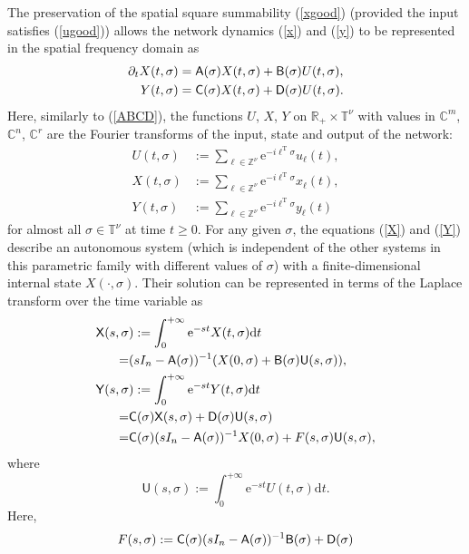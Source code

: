 \documentclass[letterpaper, 10pt, conference]{ieeeconf}  %
\def\>{\geqslant}           %
\def\d{\partial}
\def\mZ{\mathbb{Z}}    %
\def\mR{\mathbb{R}}    %
\def\mC{\mathbb{C}}    %
\def\rT{\mathrm{T}}        %
\def\re{\mathrm{e}}        %
\def\rd{\mathrm{d}}        %
\def\x{\times}
\def\sA{\mathsf{A}}
\def\sB{\mathsf{B}}
\def\sC{\mathsf{C}}
\def\sD{\mathsf{D}}
\def\sX{\mathsf{X}}
\def\sY{\mathsf{Y}}
\def\sU{\mathsf{U}}
\def\sB{{\sf B}}
\def\sC{{\sf C}}
\def\mT{\mathbb{T}}
\def\mZ{\mathbb{Z}}
\begin{document}
The preservation of the spatial square summability (\ref{xgood}) (provided the input satisfies (\ref{ugood})) allows the network dynamics (\ref{x}) and (\ref{y}) to be represented in the spatial frequency domain as
\begin{align}
\label{X}
  \d_t X(t,\sigma)
  & =
  \sA(\sigma) X(t,\sigma) + \sB(\sigma) U(t,\sigma),\\
\label{Y}
  Y(t,\sigma)
  & =
  \sC(\sigma) X(t,\sigma)+\sD(\sigma) U(t,\sigma).
\end{align}
Here, similarly to (\ref{ABCD}), the functions $U$, $X$, $Y$ on $\mR_+\x \mT^\nu$ with values in $\mC^m$, $\mC^n$, $\mC^r$ are the Fourier transforms of the input, state and output of the network:
\begin{align}
\label{uDFT}
    U(t,\sigma)
    & :=
    \sum_{\ell\in \mZ^\nu}
    \re^{-i\ell^{\rT}\sigma}
    u_\ell(t),\\
\label{xDFT}
    X(t,\sigma)
    & :=
    \sum_{\ell\in \mZ^\nu}
    \re^{-i\ell^{\rT}\sigma}
    x_\ell(t),\\
\label{yDFT}
    Y(t,\sigma)
    & :=
    \sum_{\ell\in \mZ^\nu}
    \re^{-i\ell^{\rT}\sigma}
    y_\ell(t)
\end{align}
for almost all $\sigma \in \mT^\nu$ at time $t\> 0$. For any given $\sigma$, the equations (\ref{X}) and (\ref{Y}) describe an autonomous system (which is independent of the other systems in this parametric family with different values of $\sigma$) with a finite-dimensional internal state $X(\cdot, \sigma)$.  Their solution can be represented in terms of the Laplace transform over the time variable as
\begin{align}
\nonumber
  \sX(s,\sigma&)
   :=
  \int_{0}^{+\infty}
  \re^{-st}
  X(t,\sigma)
  \rd t\\
\label{cX}
    =&
    (sI_n - \sA(\sigma))^{-1} (X(0,\sigma)+ \sB(\sigma)\sU(s,\sigma)),\\
\nonumber
  \sY(s,\sigma&)
  :=
  \int_{0}^{+\infty}
  \re^{-st}
  Y(t,\sigma)
  \rd t\\
\nonumber
  = &
  \sC(\sigma) \sX(s,\sigma)+\sD(\sigma) \sU(s,\sigma)\\
\label{cY}
  = &
  \sC(\sigma)
  (sI_n - \sA(\sigma))^{-1} X(0,\sigma)
  +
  F(s,\sigma)\sU(s,\sigma),
\end{align}
where
\begin{equation}
\label{cU}
  \sU(s,\sigma)
   :=
  \int_{0}^{+\infty}
  \re^{-st}
  U(t,\sigma)
  \rd t.
\end{equation}
Here,
\begin{equation}
\label{F}
  F(s,\sigma)
  :=
  \sC(\sigma)(sI_n - \sA(\sigma))^{-1} \sB(\sigma) + \sD(\sigma)
\end{equation}
\end{document}
